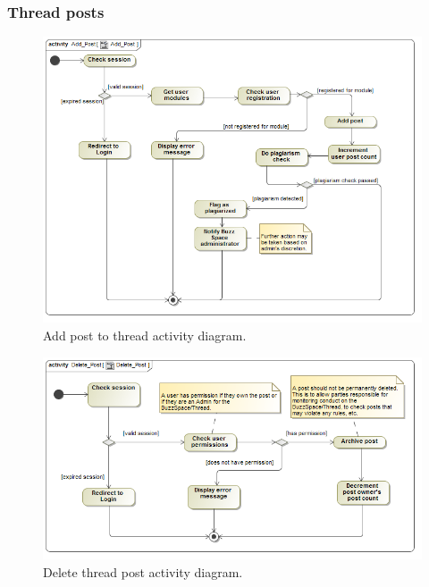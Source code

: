 \documentclass [a4paper,12pt] {article}
\begin{document}
		\subsubsection{Thread posts}
			\begin{figure}[H]
				\centering
				\includegraphics[width=1.0\textwidth]{AddPostAD.png}
				\caption{Add post to thread activity diagram.}
			\end{figure}
			\begin{figure}[H]
				\centering
				\includegraphics[width=1.0\textwidth]{DeletePostAD.png}
				\caption{Delete thread post activity diagram.}
			\end{figure}
\end{document}
